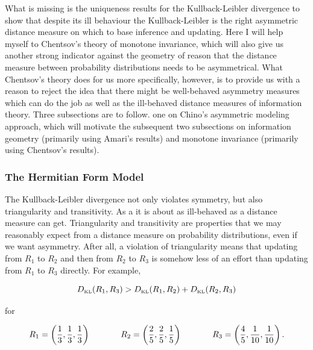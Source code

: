 \documentclass[11pt]{article}
\begin{document}
What is missing is the uniqueness results for the Kullback-Leibler
divergence to show that despite its ill behaviour the Kullback-Leibler
is the right asymmetric distance measure on which to base inference
and updating. Here I will help myself to Chentsov's theory of monotone
invariance, which will also give us another strong indicator against
the geometry of reason that the distance measure between probability
distributions needs to be asymmetrical. What Chentsov's theory does
for us more specifically, however, is to provide us with a reason to
reject the idea that there might be well-behaved asymmetry measures
which can do the job as well as the ill-behaved distance measures of
information theory. Three subsections are to follow. one on Chino's
asymmetric modeling approach, which will motivate the subsequent two
subsections on information geometry (primarily using Amari's results)
and monotone invariance (primarily using Chentsov's results).

\subsubsection{The Hermitian Form Model}
\label{subsubsec:hfm}

The Kullback-Leibler divergence not only violates symmetry, but also
triangularity and transitivity. As a  it is
about as ill-behaved as a distance measure can get. Triangularity and
transitivity are properties that we may reasonably expect from a
distance measure on probability distributions, even if we want
asymmetry. After all, a violation of triangularity means that updating
from $R_{1}$ to $R_{2}$ and then from $R_{2}$ to $R_{3}$ is somehow less of an effort
than updating from $R_{1}$ to $R_{3}$ directly. For example,

\begin{equation}
  \label{eq:triang}
  D_{\mbox{\tiny KL}}(R_{1},R_{3})>D_{\mbox{\tiny KL}}(R_{1},R_{2})+D_{\mbox{\tiny KL}}(R_{2},R_{3})
\end{equation}

for

\begin{equation}
  \label{eq:triangviol}
    R_{1}=\left(\frac{1}{3},\frac{1}{3},\frac{1}{3}\right) \hspace{.5in}
    R_{2}=\left(\frac{2}{5},\frac{2}{5},\frac{1}{5}\right)  \hspace{.5in}
    R_{3}=\left(\frac{4}{5},\frac{1}{10},\frac{1}{10}\right).
\end{equation}
\end{document}
